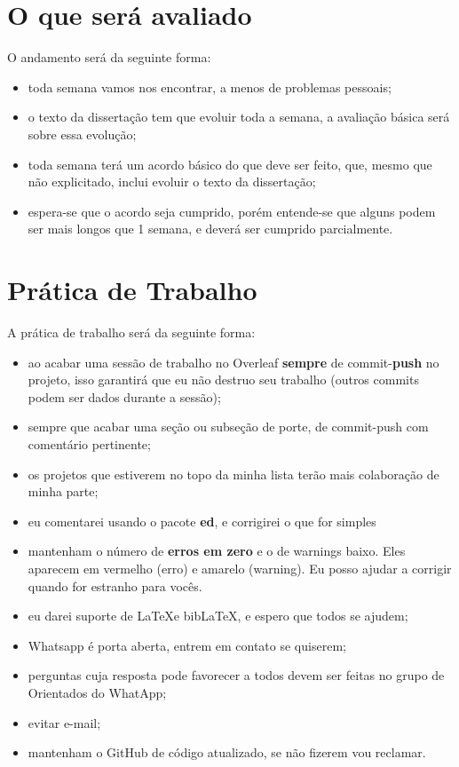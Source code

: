 \documentclass{article}
\begin{document}
\section{O que será avaliado}

O andamento será da seguinte forma:
\begin{itemize}
    \item toda semana vamos nos encontrar, a menos de problemas pessoais;
    \item o texto da dissertação tem que evoluir toda a semana, a avaliação básica será sobre essa evolução;
    \item toda semana terá um acordo básico do que deve ser feito, que, mesmo que não explicitado, inclui evoluir o texto da dissertação;
    \item espera-se que o acordo seja cumprido, porém entende-se que alguns podem ser mais longos que 1 semana, e deverá ser cumprido parcialmente.
\end{itemize}

\section{Prática de Trabalho}

A prática de trabalho será da seguinte forma:

\begin{itemize}
    \item ao acabar uma sessão de trabalho no Overleaf \textbf{sempre} de commit-\textbf{push} no projeto, isso garantirá que eu não destruo seu trabalho (outros commits podem ser dados durante a sessão);
    \item sempre que acabar uma seção ou subseção de porte, de commit-push com comentário pertinente;
    \item os projetos que estiverem no topo da minha lista terão mais colaboração de minha parte;
    \item eu comentarei usando o pacote \textbf{ed}, e corrigirei o que for simples
    \item mantenham o número de \textbf{erros em zero} e o de warnings baixo. Eles aparecem em vermelho (erro) e amarelo (warning). Eu posso ajudar a corrigir quando for estranho para vocês.
    \item eu darei suporte de \LaTeX e bib\LaTeX, e espero que todos se ajudem;
    \item Whatsapp é porta aberta, entrem em contato se quiserem;
    \item perguntas cuja resposta pode favorecer a todos devem ser feitas no grupo de Orientados do WhatApp;
    \item evitar e-mail;
    \item mantenham o GitHub de código atualizado, se não fizerem vou reclamar.
\end{itemize}
\end{document}
